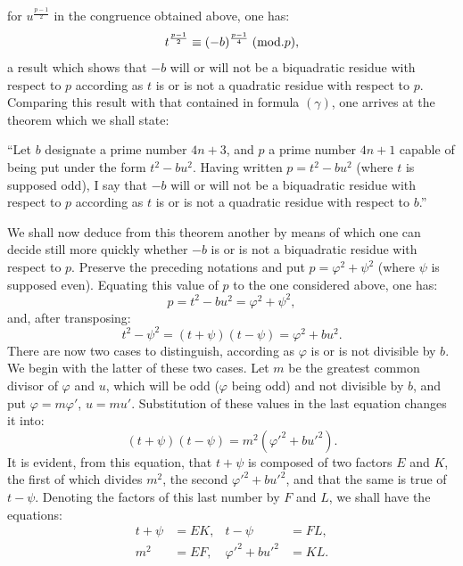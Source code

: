 \noindent
for $u^{\frac{p-1}{2}}$ in the congruence obtained above, one has:
\[
t^{\frac{p-1}{2}}\equiv(-b)^{\frac{p-1}{4}}\;(\mathrm{mod}.p),
\]
a result which shows that $-b$ will or will not be a biquadratic residue with
respect to $p$ according as $t$ is or is not a quadratic residue with respect to $p$.
Comparing this result with that contained in formula $(\gamma)$, one arrives at
the theorem which we shall state:
\par\indent
“Let $b$ designate a prime number $4n+3$, and $p$ a prime number $4n+1$ capable
of being put under the form $t^2-bu^2$. Having written $p=t^2-bu^2$ (where $t$
is supposed odd), I say that $-b$ will or will not be a biquadratic residue with
respect to $p$ according as $t$ is or is not a quadratic residue with respect to $b$.”
\par\indent
We shall now deduce from this theorem another by means of which one can
decide still more quickly whether $-b$ is or is not a biquadratic residue with
respect to $p$. Preserve the preceding notations and put $p=\varphi^2+\psi^2$
(where $\psi$ is supposed even). Equating this value of $p$ to the one considered
above, one has:
\[
p=t^2-bu^2=\varphi^2+\psi^2,
\]
and, after transposing:
\[
t^2-\psi^2=(t+\psi)(t-\psi)=\varphi^2+bu^2.
\]
There are now two cases to distinguish, according as $\varphi$ is or is not
divisible by $b$. We begin with the latter of these two cases. Let $m$ be the
greatest common divisor of $\varphi$ and $u$, which will be odd ($\varphi$ being odd)
and not divisible by $b$, and put $\varphi=m\varphi'$, $u=mu'$. Substitution of
these values in the last equation changes it into:
\[
(t+\psi)(t-\psi)=m^2(\varphi'^2+bu'^2).
\]
It is evident, from this equation, that $t+\psi$ is composed of two factors
$E$ and $K$, the first of which divides $m^2$, the second $\varphi'^2+bu'^2$,
and that the same is true of $t-\psi$. Denoting the factors of this last
number by $F$ and $L$, we shall have the equations:
\[
\begin{aligned}
t+\psi&=EK, &t-\psi&=FL,\\
m^2&=EF, &\varphi'^2+bu'^2&=KL.
\end{aligned}
\]
